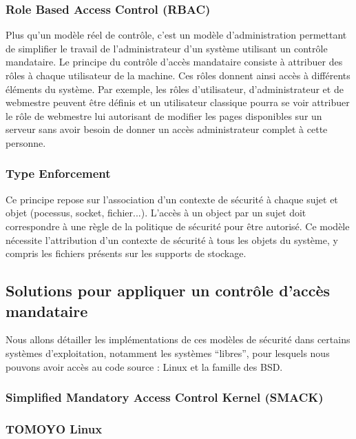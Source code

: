 \documentclass[pdftex,a4paper,titlepage,11pt]{article}
\begin{document}
\subsubsection{Role Based Access Control (RBAC)}

Plus qu'un modèle réel de contrôle, c'est un modèle d'administration permettant de simplifier le travail de l'administrateur d'un système utilisant un contrôle mandataire. Le principe du contrôle d'accès mandataire consiste à attribuer des rôles à chaque utilisateur de la machine. Ces rôles donnent ainsi accès à différents éléments du système. Par exemple, les rôles d'utilisateur, d'administrateur et de webmestre peuvent être définis et un utilisateur classique pourra se voir attribuer le rôle de webmestre lui autorisant de modifier les pages disponibles sur un serveur sans avoir besoin de donner un accès administrateur complet à cette personne.

\subsubsection{Type Enforcement}

Ce principe repose sur l'association d'un contexte de sécurité à chaque sujet et objet (pocessus, socket, fichier...). L'accès à un object par un sujet doit correspondre à une règle de la politique de sécurité pour être autorisé. Ce modèle nécessite l'attribution d'un contexte de sécurité à tous les objets du système, y compris les fichiers présents sur les supports de stockage.

\subsection{Solutions pour appliquer un contrôle d'accès mandataire}

Nous allons détailler les implémentations de ces modèles de sécurité dans certains systèmes d'exploitation, notamment les systèmes ``libres'', pour lesquels nous pouvons avoir accès au code source : Linux et la famille des BSD.

\subsubsection{Simplified Mandatory Access Control Kernel (SMACK)}

\subsubsection{TOMOYO Linux}
\end{document}
